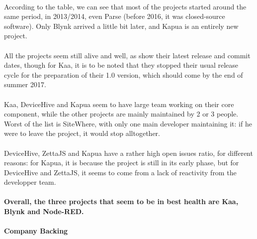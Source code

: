 \documentclass{article}
\begin{document}
\paragraph{} According to the table, we can see that most of the projects started around the same period, in 2013/2014, even Parse (before 2016, it was closed-source software). Only Blynk arrived a little bit later, and Kapua is an entirely new project.

\paragraph{} All the projects seem still alive and well, as show their latest release and commit dates, though for Kaa, it is to be noted that they stopped their usual release cycle for the preparation of their 1.0 version, which should come by the end of summer 2017.

\paragraph{} Kaa, DeviceHive and Kapua seem to have large team working on their core component, while the other projects are mainly maintained by 2 or 3 people. Worst of the list is SiteWhere, with only one main developer maintaining it: if he were to leave the project, it would stop alltogether.

\paragraph{} DeviceHive, ZettaJS and Kapua have a rather high open issues ratio, for different reasons: for Kapua, it is because the project is still in its early phase, but for DeviceHive and ZettaJS, it seems to come from a lack of reactivity from the developper team.

\paragraph{} \textbf{Overall, the three projects that seem to be in best health are Kaa, Blynk and Node-RED.}

\newpage

\paragraph{Company Backing}
\end{document}

